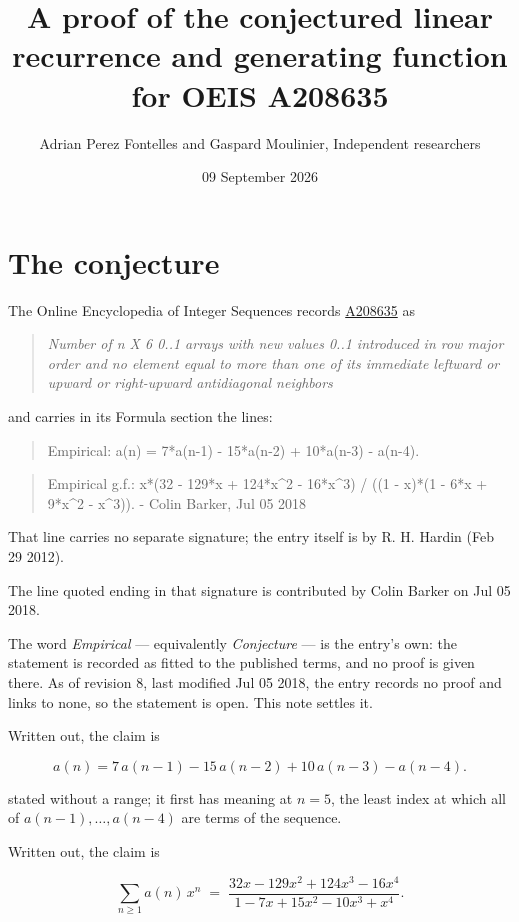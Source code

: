 \documentclass[11pt]{article}
\title{A proof of the conjectured linear recurrence and generating function for OEIS A208635}
\author{Adrian Perez Fontelles and Gaspard Moulinier, Independent researchers}
\date{09 September 2026}
\theoremstyle{definition}
\begin{document}
\maketitle
\section{The conjecture}

The Online Encyclopedia of Integer Sequences records \href{https://oeis.org/A208635}{A208635} as

\begin{quote}\itshape Number of n X 6 0..1 arrays with new values 0..1 introduced in row major order and no element equal to more than one of its immediate leftward or upward or right-upward antidiagonal neighbors\end{quote}

and carries in its Formula section the lines:

\begin{quote}\ttfamily Empirical: a(n) = 7*a(n-1) - 15*a(n-2) + 10*a(n-3) - a(n-4).\end{quote}

\begin{quote}\ttfamily Empirical g.f.: x*(32 - 129*x + 124*x\textasciicircum{}2 - 16*x\textasciicircum{}3) / ((1 - x)*(1 - 6*x + 9*x\textasciicircum{}2 - x\textasciicircum{}3)). - Colin Barker, Jul 05 2018\end{quote}

That line carries no separate signature; the entry itself is by R. H. Hardin (Feb 29 2012).

The line quoted ending in that signature is contributed by Colin Barker on Jul 05 2018.

The word {\itshape Empirical} --- equivalently {\itshape Conjecture} --- is the entry's own: the statement is recorded as fitted to the published terms, and no proof is given there. As of revision 8, last modified Jul 05 2018, the entry records no proof and links to none, so the statement is open. This note settles it.

Written out, the claim is

\[a(n) = 7\,a(n-1) - 15\,a(n-2) + 10\,a(n-3) - a(n-4).\]

stated without a range; it first has meaning at $n = 5$, the least index at which all of $a(n-1),\dots,a(n-4)$ are terms of the sequence.

Written out, the claim is

\[\sum_{n \ge 1} a(n)\,x^n \;=\; \frac{32x - 129x^{2} + 124x^{3} - 16x^{4}}{1 - 7x + 15x^{2} - 10x^{3} + x^{4}}.\]
\end{document}

